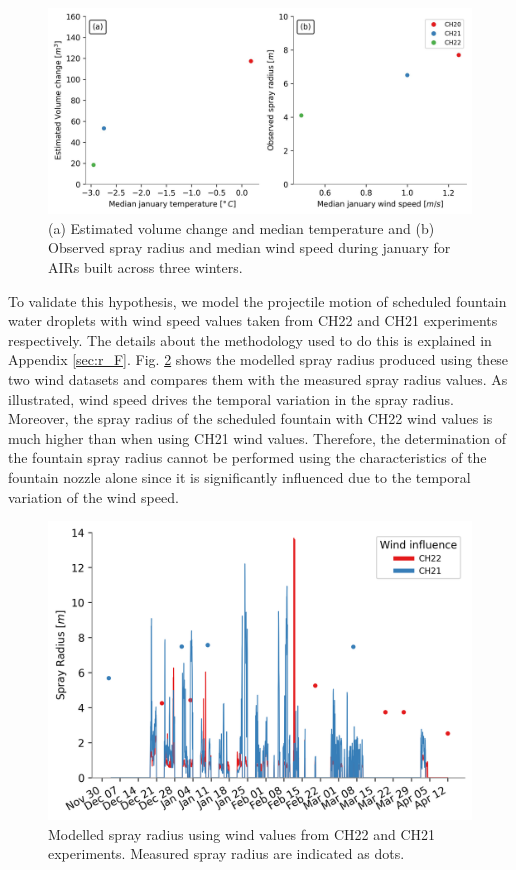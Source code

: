 \documentclass[tc, manuscript]{copernicus}
\begin{document}
\begin{figure}[t]
\includegraphics[width=\textwidth]{Figures/CH_diffs.jpg}

\caption{(a) Estimated volume change and median temperature and (b) Observed spray radius and median wind speed
during january for AIRs built across three winters. } 

\label{fig:CH_diffs} 
\end{figure}

To validate this hypothesis, we model the projectile motion of scheduled fountain water droplets with wind speed
values taken from CH22 and CH21 experiments respectively. The details about the methodology used to do this is
explained in Appendix \ref{sec:r_F}. Fig. \ref{fig:wind} shows the modelled spray radius produced using these
two wind datasets and compares them with the measured spray radius values. As illustrated, wind speed drives the
temporal variation in the spray radius. Moreover, the spray radius of the scheduled fountain with CH22 wind
values is much higher than when using CH21 wind values. Therefore, the determination of the fountain spray
radius cannot be performed using the characteristics of the fountain nozzle alone since it is significantly
influenced due to the temporal variation of the wind speed.


\begin{figure}[t]
\includegraphics[width=12 cm]{Figures/radf.png}
\caption{Modelled spray radius using wind values from CH22 and CH21 experiments. Measured spray radius are
indicated as dots.}
\label{fig:wind}
\end{figure}
\end{document}
